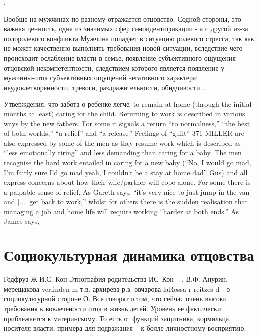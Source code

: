 \documentclass{../../common/thesisbyxetex}
\begin{document}
.

Вообще на мужчинах по-разному отражается отцовство. Содной стороны, это важная ценность, одна из
значимых сфер самоидентификации - а с другой из-за полоролевого конфликта  Мужчина попадает в
ситуацию ролевого стресса, так как не может
качественно выполнять требования новой ситуации, вследствие чего происходит
ослабление власти в семье, появление субъективного ощущения отцовской
некомпетентности, следствием которого является появление у мужчины-отца
субъективных ощущений негативного характера: неудовлетворенности, тревоги,
раздражительности, обидчивости \cite[111]{confl}.


Утверждения, что забота о ребенке легче,
to remain at home (through the initial months at least) caring for the child. Returning
to work is described in various ways by the new fathers. For some it signals a return
“to normalness,” “the best of both worlds,” “a relief” and “a release.” Feelings of “guilt”
371
MILLER
are also expressed by some of the men as they resume work which is described as “less
emotionally tiring” and less demanding than caring for a baby. The men recognise the
hard work entailed in caring for a new baby (“No, I would go mad, I’m fairly sure I’d
go mad yeah, I couldn’t be a stay at home dad” Gus) and all express concerns about how
their wife/partner will cope alone. For some there is a palpable sense of relief. As
Gareth says, “it’s very nice to just jump in the van and [...] get back to work,” whilst
for others there is the sudden realisation that managing a job and home life will require
working “harder at both ends.”\cite[370-371]{tri} As James says,



\section{Социокультурная динамика отцовства}



Годфруа Ж 
И.С. Кон Этнография родительства
ИС Кон -
,
В.Ф. Анурин, мерещакова verlinden m
т.в. архирева
р.в. овчарова
laRossa r reitzes d  - о социокультурной стороне О.
Все говорят о том, что сейчас очень высоки требования к вовлечености отца в жизнь детей. Уровень ее 
фактически приблежается к материнскому. То есть от функций защитника, кормильца, носителя власти, 
примера для подражания – к болле личностному восприятию.
\end{document}

